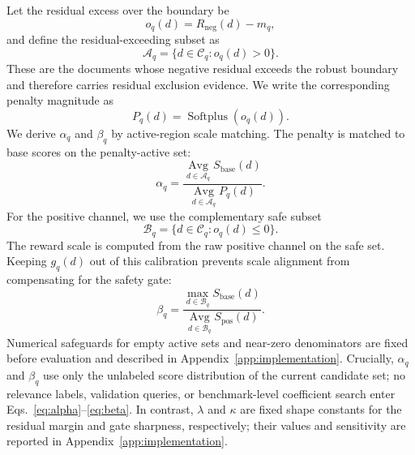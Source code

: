 \documentclass[letterpaper]{article}
\newcommand{\sbase}{S_{\text{base}}}
\newcommand{\spos}{S_{\text{pos}}}
\begin{document}
Let the residual excess over the boundary be
%
\begin{equation}
  o_q(d) = R_{\text{neg}}(d) - m_q,
  \label{eq:residual-excess}
\end{equation}
%
and define the residual-exceeding subset as
%
\begin{equation}
  \mathcal{A}_q =
  \{d \in \mathcal{C}_q : o_q(d) > 0\}.
  \label{eq:exceeding-set}
\end{equation}
%
These are the documents whose negative residual exceeds the robust
boundary and therefore carries residual exclusion evidence.  We write
the corresponding penalty magnitude as
%
\begin{equation}
  P_q(d) = \operatorname{Softplus}(o_q(d)).
  \label{eq:penalty-magnitude}
\end{equation}
%
We derive $\alpha_q$ and $\beta_q$ by active-region scale matching.
The penalty is matched to base scores on the penalty-active set:
%
\begin{equation}
  \alpha_q =
    \frac{
      \operatorname*{Avg}_{d\in\mathcal{A}_q} \sbase(d)
    }{
      \operatorname*{Avg}_{d\in\mathcal{A}_q} P_q(d)
    }.
  \label{eq:alpha}
\end{equation}
%
For the positive channel, we use the complementary safe subset
%
\begin{equation}
  \mathcal{B}_q =
  \{d \in \mathcal{C}_q : o_q(d) \leq 0\}.
  \label{eq:safe-set}
\end{equation}
%
The reward scale is computed from the raw positive channel on the safe
set.  Keeping $g_q(d)$ out of this calibration prevents scale alignment
from compensating for the safety gate:
%
\begin{equation}
  \beta_q =
    \frac{
      \max_{d\in\mathcal{B}_q} \sbase(d)
    }{
      \operatorname*{Avg}_{d\in\mathcal{B}_q} \spos(d)
    }.
  \label{eq:beta}
\end{equation}
%
Numerical safeguards for empty active sets and near-zero denominators
are fixed before evaluation and described in Appendix~\ref{app:implementation}.
Crucially, $\alpha_q$ and $\beta_q$ use only the unlabeled score
distribution of the current candidate set; no relevance labels,
validation queries, or benchmark-level coefficient search enter
Eqs.~\ref{eq:alpha}--\ref{eq:beta}.  In contrast, $\lambda$ and
$\kappa$ are fixed shape constants for the residual margin and gate
sharpness, respectively; their values and sensitivity are reported in
Appendix~\ref{app:implementation}.
\end{document}
